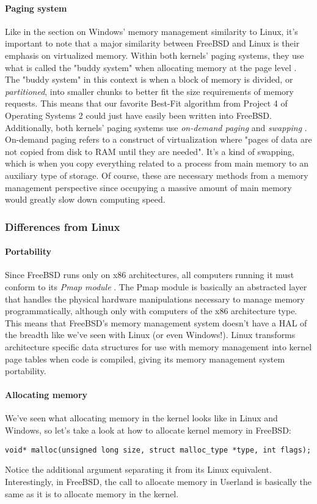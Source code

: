 \documentclass[letterpaper,10pt,titlepage]{article}
\begin{document}
\paragraph{Paging system}
Like in the section on Windows' memory management similarity to Linux, it's important to note that a major similarity between FreeBSD and Linux is their emphasis on virtualized memory. Within both kernels' paging systems, they use what is called the "buddy system" when allocating memory at the page level \cite{freeBSD1} \cite{linux2}. The "buddy system" in this context is when a block of memory is divided, or \emph{partitioned}, into smaller chunks to better fit the size requirements of memory requests. This means that our favorite Best-Fit algorithm from Project 4 of Operating Systems 2 could just have easily been written into FreeBSD. Additionally, both kernels' paging systems use \emph{on-demand paging} and \emph{swapping} \cite{freeBSD2} \cite{linux}. On-demand paging refers to a construct of virtualization where "pages of data are not copied from disk to RAM until they are needed". It's a kind of swapping, which is when you copy everything related to a process from main memory to an auxiliary type of storage. Of course, these are necessary methods from a memory management perspective since occupying a massive amount of main memory would greatly slow down computing speed. 

% 
%
%
\subsubsection{Differences from Linux}
\paragraph{Portability}
Since FreeBSD runs only on x86 architectures, all computers running it must conform to its \emph{Pmap module} \cite{freeBSD1}. The Pmap module is basically an abstracted layer that handles the physical hardware manipulations necessary to manage memory programmatically, although only with computers of the x86 architecture type. This means that FreeBSD's memory management system doesn't have a HAL of the breadth like we've seen with Linux (or even Windows!). Linux transforms architecture specific data structures for use with memory management into kernel page tables when code is compiled, giving its memory management system portability. 
\paragraph{Allocating memory}
We've seen what allocating memory in the kernel looks like in Linux and Windows, so let's take a look at how to allocate kernel memory in FreeBSD: \cite{freeBSD2}
\begin{lstlisting}
void* malloc(unsigned long size, struct malloc_type *type, int flags);
\end{lstlisting}
Notice the additional argument separating it from its Linux equivalent. Interestingly, in FreeBSD, the call to allocate memory in Userland is basically the same as it is to allocate memory in the kernel. 
\end{document}
